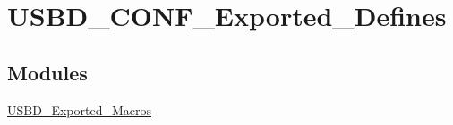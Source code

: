 \hypertarget{group___u_s_b_d___c_o_n_f___exported___defines}{}\section{U\+S\+B\+D\+\_\+\+C\+O\+N\+F\+\_\+\+Exported\+\_\+\+Defines}
\label{group___u_s_b_d___c_o_n_f___exported___defines}
\subsection*{Modules}
\begin{DoxyCompactItemize}
\item 
\mbox{\hyperlink{group___u_s_b_d___exported___macros}{U\+S\+B\+D\+\_\+\+Exported\+\_\+\+Macros}}
\end{DoxyCompactItemize}
